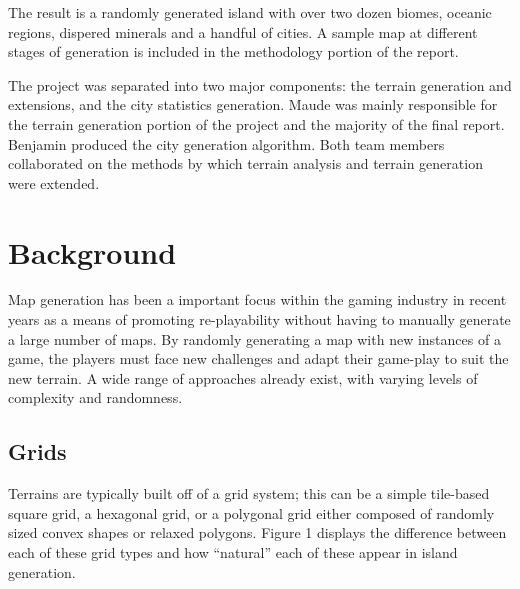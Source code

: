 The result is a randomly generated island with over two dozen biomes, oceanic regions, dispered minerals and a handful of cities. A sample map at different stages of generation is included in the methodology portion of the report.

The project was separated into two major components: the terrain generation and extensions, and the city statistics generation. Maude was mainly responsible for the terrain generation portion of the project and the majority of the final report. Benjamin produced the city generation algorithm. Both team members collaborated on the methods by which terrain analysis and terrain generation were extended.

\section{Background}
Map generation has been a important focus within the gaming industry in recent years as a means of promoting re-playability without having to manually generate a large number of maps. By randomly generating a map with new instances of a game, the players must face new challenges and adapt their game-play to suit the new terrain. A wide range of approaches already exist, with varying levels of complexity and randomness.

\subsection{Grids}
Terrains are typically built off of a grid system; this can be a simple tile-based square grid, a hexagonal grid, or a polygonal grid either composed of randomly sized convex shapes or relaxed polygons. Figure 1 displays the difference between each of these grid types and how ``natural'' each of these appear in island generation.

